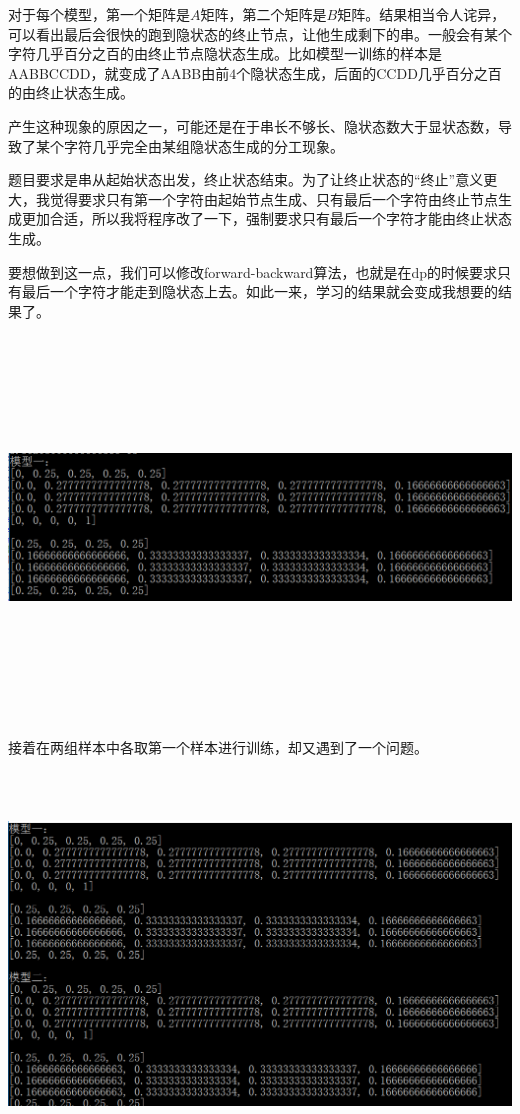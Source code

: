 \documentclass{ctexart}
\begin{document}
对于每个模型，第一个矩阵是$A$矩阵，第二个矩阵是$B$矩阵。结果相当令人诧异，可以看出最后会很快的跑到隐状态的终止节点，让他生成剩下的串。一般会有某个字符几乎百分之百的由终止节点隐状态生成。比如模型一训练的样本是AABBCCDD，就变成了AABB由前$4$个隐状态生成，后面的CCDD几乎百分之百的由终止状态生成。

产生这种现象的原因之一，可能还是在于串长不够长、隐状态数大于显状态数，导致了某个字符几乎完全由某组隐状态生成的分工现象。

题目要求是串从起始状态出发，终止状态结束。为了让终止状态的“终止”意义更大，我觉得要求只有第一个字符由起始节点生成、只有最后一个字符由终止节点生成更加合适，所以我将程序改了一下，强制要求只有最后一个字符才能由终止状态生成。

要想做到这一点，我们可以修改forward-backward算法，也就是在dp的时候要求只有最后一个字符才能走到隐状态上去。如此一来，学习的结果就会变成我想要的结果了。

\includegraphics[width=6in,height=4in]{2.png}

接着在两组样本中各取第一个样本进行训练，却又遇到了一个问题。

\includegraphics[width=6in,height=4in]{3.png}
\end{document}
